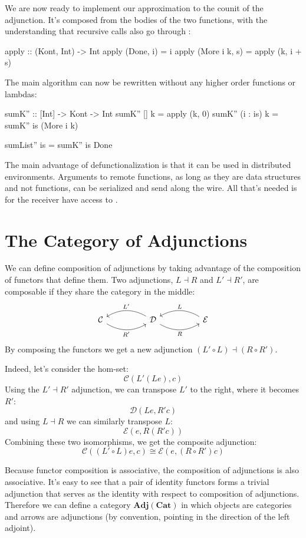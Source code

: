 \documentclass[DaoFP]{subfiles}
\begin{document}
We are now ready to implement our approximation to the counit of the adjunction. It's composed from the bodies of the two functions, with the understanding that recursive calls also go through :
\begin{haskell}
apply :: (Kont, Int) -> Int
apply (Done, i) = i
apply (More i k, s) = apply (k, i + s)
\end{haskell}
The main algorithm can now be rewritten without any higher order functions or lambdas:
\begin{haskell}
sumK'' :: [Int] -> Kont -> Int
sumK'' [] k = apply (k, 0)
sumK'' (i : is) k = sumK'' is (More i k)
\end{haskell}

\begin{haskell}
sumList'' is = sumK'' is Done
\end{haskell}

The main advantage of defunctionalization is that it can be used in distributed environments. Arguments to remote functions, as long as they are data structures and not functions, can be serialized and send along the wire. All that's needed is for the receiver have access to . 

\section{The Category of Adjunctions}
We can define composition of adjunctions by taking advantage of the composition of functors that define them. Two adjunctions, $L \dashv R$ and $L' \dashv R'$, are composable if they share the category in the middle:
\[
 \begin{tikzcd}
  \mathcal{C}
  \arrow[rr, bend right, "R'"']
  &&
  \mathcal{D}
  \arrow[ll, bend right, "L'"']
    \arrow[rr, bend right, "R"']
&&
  \mathcal{E}
  \arrow[ll, bend right, "L"']
 \end{tikzcd}
\]
By composing the functors we get a new adjunction $(L' \circ L) \dashv (R \circ R')$. 

Indeed, let's consider the hom-set:
\[ \mathcal{C}(L' (L e), c) \]
Using the $L' \dashv R'$ adjunction, we can transpose $L'$ to the right, where it becomes $R'$:
\[ \mathcal{D}(L e, R' c) \]
and using $L \dashv R$ we can similarly transpose $L$:
\[ \mathcal{E}( e, R(R' c)) \]
Combining these two isomorphisms, we get the composite adjunction:
\[ \mathcal{C}((L' \circ L) e, c) \cong \mathcal{E}( e, (R \circ R') c)\]

Because functor composition is associative, the composition of adjunctions is also associative. It's easy to see that a pair of identity functors forms a trivial adjunction that serves as the identity with respect to composition of adjunctions. Therefore we can define a category $\mathbf{Adj}(\mathbf{Cat})$ in which objects are categories and arrows are adjunctions (by convention, pointing in the direction of the left adjoint). 
\end{document}
